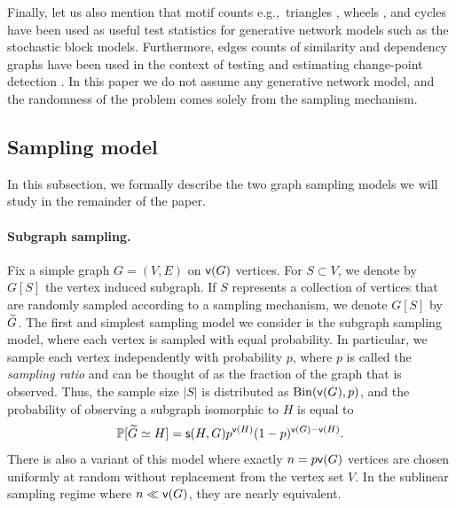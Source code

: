 Finally, let us also mention that motif counts e.g.,~triangles \cite{GaoLafferty2017}, wheels \cite{Bickel2011}, and cycles \cite{MosselNeemanSly2015} have been used as useful test statistics for generative network models such as the stochastic block models. Furthermore, edges counts of similarity and dependency graphs have been used in the context of testing and estimating change-point detection \cite{chen2015graph, chu2017asymptotic}.
In this paper we do not assume any generative network model, and the randomness of the problem comes solely from the sampling mechanism.


\subsection{Sampling model} \label{sec:model}

In this subsection, we formally describe the two graph sampling models we will study in the remainder of the paper.



\paragraph{Subgraph sampling.}

Fix a simple graph $ G = (V, E) $ on $ {\mathsf{v}}(G) $ vertices. For $ S \subset V $, we denote by $ G[S] $ the vertex induced subgraph. If $ S $ represents a collection of vertices that are randomly sampled according to a sampling mechanism, we denote $ G[S] $ by $ {\widetilde{G}} $. The first and simplest sampling model we consider is the subgraph sampling model, where each vertex is sampled with equal probability. In particular, we sample each vertex independently with probability $p$, where $p$ is called the \emph{sampling ratio} and can be thought of as the fraction of the graph that is observed. Thus, the sample size $|S|$ is distributed as $\mathrm{Bin}({\mathsf{v}}(G), p) $, and the probability of observing a subgraph isomorphic to $ H $ is equal to
\begin{equation*}
\mathbb{P}[ {\widetilde{G}} \simeq H ] = \mathsf{s}(H, G)p^{{\mathsf{v}}(H)}(1-p)^{{\mathsf{v}}(G)-{\mathsf{v}}(H)}.
\label{eq:pmf-bern}
\end{equation*}
There is also a variant of this model where exactly $ n = p{\mathsf{v}}(G) $ vertices are chosen uniformly at random without replacement from the vertex set $ V $. In the sublinear sampling regime where $n \ll {\mathsf{v}}(G)$, they are nearly equivalent. 

